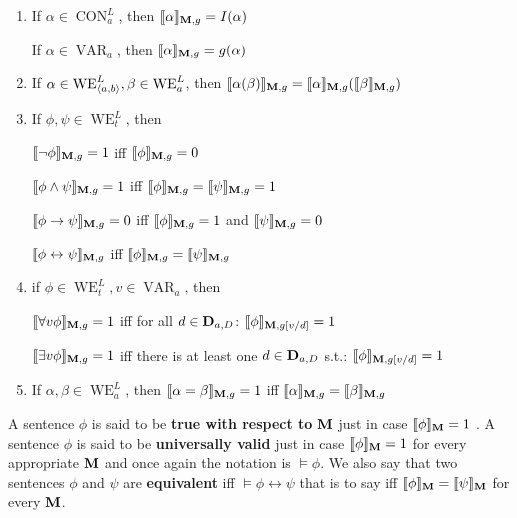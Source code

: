 \documentclass[11pt]{article}
\DeclareMathOperator{\VAR}{VAR}
\DeclareMathOperator{\CON}{CON}
\DeclareMathOperator{\WE}{WE}
\begin{document}
\begin{definition}[]
\label{def4.2.3}
\begin{enumerate}
\item If \(\alpha\in \CON_a^L\), then
\(\llbracket\alpha\rrbracket_{\operatorname{\textbf{M}},g}=I(\alpha)\)

If \(\alpha\in \VAR_a\), then \(\llbracket\alpha\rrbracket_{\operatorname{\textbf{M}},g}=g(\alpha)\)

\item If \(\alpha\in \WE^L_{\la a,b\ra},\beta\in \WE^L_a\), then
\(\llbracket\alpha(\beta)\rrbracket_{\operatorname{\textbf{M}},g}=\llbracket\alpha\rrbracket_{\operatorname{\textbf{M}},g}(
       \llbracket\beta\rrbracket_{\operatorname{\textbf{M}},g})\)

\item If \(\phi,\psi\in \WE_t^L\), then

\(\llbracket\neg\phi\rrbracket_{\operatorname{\textbf{M}},g}=1\) iff
\(\llbracket\phi\rrbracket_{\operatorname{\textbf{M}},g}=0\)

\(\llbracket\phi\wedge\psi\rrbracket_{\operatorname{\textbf{M}},g}=1\) iff
\(\llbracket\phi\rrbracket_{\operatorname{\textbf{M}},g}=\llbracket\psi\rrbracket_{\operatorname{\textbf{M}},g}=1\)

\(\llbracket\phi\to\psi\rrbracket_{\operatorname{\textbf{M}},g}=0\) iff
\(\llbracket\phi\rrbracket_{\operatorname{\textbf{M}},g}=1\) and
\(\llbracket\psi\rrbracket_{\operatorname{\textbf{M}},g}=0\)

\(\llbracket\phi\leftrightarrow\psi\rrbracket_{\operatorname{\textbf{M}},g}\) iff
\(\llbracket\phi\rrbracket_{\operatorname{\textbf{M}},g}=\llbracket\psi\rrbracket_{\operatorname{\textbf{M}},g}\)

\item if \(\phi\in \WE_t^L,v\in \VAR_a\), then

\(\llbracket\forall v\phi\rrbracket_{\operatorname{\textbf{M}},g}=1\) iff for all
\(d\in\operatorname{\textbf{D}}_{a,D}\):
\(\llbracket\phi\rrbracket_{\operatorname{\textbf{M}},g[v/d]}=1\)

\(\llbracket\exists v\phi\rrbracket_{\operatorname{\textbf{M}},g}=1\) iff there is at least one
\(d\in\operatorname{\textbf{D}}_{a,D}\) s.t.: \(\llbracket\phi\rrbracket_{\operatorname{\textbf{M}},g[v/d]}=1\)

\item If \(\alpha,\beta\in \WE_a^L\), then
\(\llbracket\alpha=\beta\rrbracket_{\operatorname{\textbf{M}},g}=1\) iff
\(\llbracket\alpha\rrbracket_{\operatorname{\textbf{M}},g}=\llbracket\beta\rrbracket_{\operatorname{\textbf{M}},g}\)
\end{enumerate}
\end{definition}

A sentence \(\phi\) is said to be \textbf{true with respect to} \(\operatorname{\textbf{M}}\) just in case
\(\llbracket\phi\rrbracket_{\operatorname{\textbf{M}}}=1\) . A sentence \(\phi\) is said to be
\textbf{universally valid} just in case \(\llbracket\phi\rrbracket_{\operatorname{\textbf{M}}}=1\) for
every appropriate \(\operatorname{\textbf{M}}\) and once again the notation is \(\models\phi\). We
also say that two sentences \(\phi\) and \(\psi\) are \textbf{equivalent} iff
\(\models\phi\leftrightarrow\psi\) that is to say iff
\(\llbracket\phi\rrbracket_{\operatorname{\textbf{M}}}=\llbracket\psi\rrbracket_{\operatorname{\textbf{M}}}\) for every \(\operatorname{\textbf{M}}\).
\end{document}

